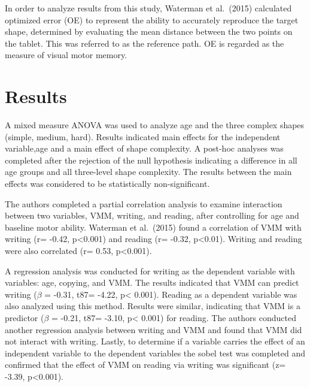 \documentclass[
  english,
  man]{apa6}
\begin{document}
In order to analyze results from this study, Waterman et al.~(2015) calculated optimized error (OE) to represent the ability to accurately reproduce the target shape, determined by evaluating the mean distance between the two points on the tablet. This was referred to as the reference path. OE is regarded as the measure of visual motor memory.

\hypertarget{results}{%
\section{Results}\label{results}}

A mixed measure ANOVA was used to analyze age and the three complex shapes (simple, medium, hard). Results indicated main effects for the independent variable,age and a main effect of shape complexity. A post-hoc analyses was completed after the rejection of the null hypothesis indicating a difference in all age groups and all three-level shape complexity. The results between the main effects was considered to be statistically non-significant.

The authors completed a partial correlation analysis to examine interaction between two variables, VMM, writing, and reading, after controlling for age and baseline motor ability. Waterman et al.~(2015) found a correlation of VMM with writing (r= -0.42, p\textless0.001) and reading (r= -0.32, p\textless0.01). Writing and reading were also correlated (r= 0.53, p\textless0.001).

A regression analysis was conducted for writing as the dependent variable with variables: age, copying, and VMM. The results indicated that VMM can predict writing (\(\beta\) = -0.31, t87= -4.22, p\textless{} 0.001). Reading as a dependent variable was also analyzed using this method. Results were similar, indicating that VMM is a predictor (\(\beta\) = -0.21, t87= -3.10, p\textless{} 0.001) for reading. The authors conducted another regression analysis between writing and VMM and found that VMM did not interact with writing. Lastly, to determine if a variable carries the effect of an independent variable to the dependent variables the sobel test was completed and confirmed that the effect of VMM on reading via writing was significant (z= -3.39, p\textless0.001).
\end{document}
